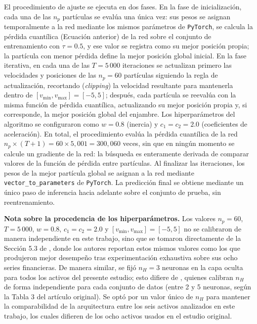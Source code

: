 \documentclass[12pt]{paper}
\begin{document}
El procedimiento de ajuste se ejecuta en dos fases. En la fase de inicialización, cada una de las $n_p$ partículas se evalúa una única vez: sus pesos se asignan temporalmente a la red mediante los mismos parámetros de \texttt{PyTorch}, se calcula la pérdida cuantílica (Ecuación anterior) de la red sobre el conjunto de entrenamiento con $\tau = 0.5$, y ese valor se registra como su mejor posición propia; la partícula con menor pérdida define la mejor posición global inicial. En la fase iterativa, en cada una de las $T = 5\,000$ iteraciones se actualizan primero las velocidades y posiciones de las $n_p = 60$ partículas siguiendo la regla de actualización, recortando (\textit{clipping}) la velocidad resultante para mantenerla dentro de $[v_{\min}, v_{\max}] = [-5, 5]$; después, cada partícula se reevalúa con la misma función de pérdida cuantílica, actualizando su mejor posición propia y, si corresponde, la mejor posición global del enjambre. Los hiperparámetros del algoritmo se configuraron como $w = 0.8$ (inercia) y $c_1 = c_2 = 2.0$ (coeficientes de aceleración). En total, el procedimiento evalúa la pérdida cuantílica de la red $n_p \times (T+1) = 60 \times 5{,}001 = 300{,}060$ veces, sin que en ningún momento se calcule un gradiente de la red: la búsqueda es enteramente derivada de comparar valores de la función de pérdida entre partículas. Al finalizar las iteraciones, los pesos de la mejor partícula global se asignan a la red mediante \texttt{vector\_to\_parameters} de \texttt{PyTorch}. La predicción final se obtiene mediante un único paso de inferencia hacia adelante sobre el conjunto de prueba, sin reentrenamiento.

\textbf{Nota sobre la procedencia de los hiperparámetros.} Los valores $n_p = 60$, $T = 5\,000$, $w = 0.8$, $c_1 = c_2 = 2.0$ y $[v_{\min}, v_{\max}] = [-5, 5]$ no se calibraron de manera independiente en este trabajo, sino que se tomaron directamente de la Sección 5.3 de \citet{pradeepkumar2017forecasting}, donde los autores reportan estos mismos valores como los que produjeron mejor desempeño tras experimentación exhaustiva sobre sus ocho series financieras. De manera similar, se fijó $n_H = 3$ neuronas en la capa oculta para todos los activos del presente estudio; esto difiere de \citet{pradeepkumar2017forecasting}, quienes calibran $n_H$ de forma independiente para cada conjunto de datos (entre 2 y 5 neuronas, según la Tabla 3 del artículo original). Se optó por un valor único de $n_H$ para mantener la comparabilidad de la arquitectura entre los seis activos analizados en este trabajo, los cuales difieren de los ocho activos usados en el estudio original.
\end{document}
